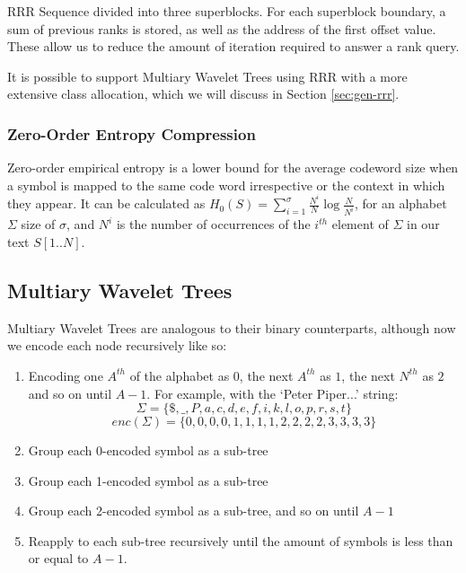 		{RRR Sequence divided into three superblocks. For each superblock
		boundary, a sum of previous ranks is stored, as well as the address
		of the first offset value. These allow us to reduce the amount of 
		iteration required to answer a rank query.}

It is possible to support Multiary Wavelet Trees using RRR with a more extensive 
class allocation, which we will discuss in Section \ref{sec:gen-rrr}.

\subsubsection{Zero-Order Entropy Compression}
\label{sec:entropy}
Zero-order empirical entropy is a lower bound for the average codeword size
when a symbol is mapped to the same code word irrespective or the context in
which they appear. It can be calculated as $H_0(S) = \sum_{i = 1}^{\sigma}
\frac{N^i}{N} \log \frac{N}{N^i}$, for an alphabet $\Sigma$ size of $\sigma$, 
and $N^i$ is the number of occurrences of the $i^{th}$ element of $\Sigma$ in 
our text $S[1..N]$. 



\clearpage
\subsection{Multiary Wavelet Trees}
Multiary Wavelet Trees are analogous to their binary counterparts, although now 
we encode each node recursively like so:

\begin{enumerate}
    \item Encoding one $A^{th}$ of the alphabet as $0$, the next $A^{th}$ as 
		$1$, the next $N^{th}$ as $2$ and so on until $A-1$. For example, with 
		the `Peter Piper...' string:
		$$\Sigma = \{ \$, \_, P, a, c, d, e, f, i, k, l, o, p, r, s, t \}$$
	   	$$enc(\Sigma) = \{  0,  0, 0, 0, 1, 1, 1, 1, 2, 2, 2, 2, 3, 3, 3, 3 \}$$
    \item Group each 0-encoded symbol as a sub-tree
    \item Group each 1-encoded symbol as a sub-tree
    \item Group each 2-encoded symbol as a sub-tree, and so on until $A-1$
    \item Reapply to each sub-tree recursively until the amount of symbols is
	less than or equal to $A - 1$.
\end{enumerate}

